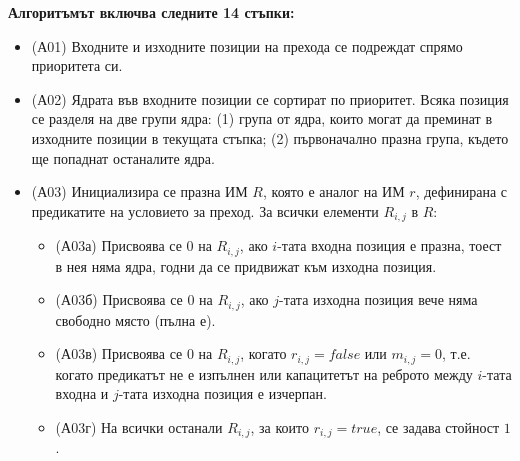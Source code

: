 \vspace{0.5cm}

{\setlength{\parskip}{0pt}  %
\textbf{Алгоритъмът включва следните 14 стъпки:}
}

\vspace{-0.4cm}

\begin{itemize}
  \item (А01) Входните и изходните позиции на прехода се подреждат спрямо приоритета си.

  \item (А02) Ядрата във входните позиции се сортират по приоритет. Всяка позиция се разделя на 
  две групи ядра: (1) група от ядра, които могат да преминат в изходните позиции в текущата стъпка; 
  (2) първоначално празна група, където ще попаднат останалите ядра.

  \item (А03) Инициализира се празна ИМ $R$, която е аналог на ИМ $r$, дефинирана с предикатите 
  на условието за преход. За всички елементи $R_{i,j}$ в $R$:
  \begin{itemize}[itemsep=0.5em]
    \item (А03а) Присвоява се $0$ на $R_{i,j}$, ако $i$-тата входна позиция е празна, тоест в нея 
    няма ядра, годни да се придвижат към изходна позиция.
    \item (А03б) Присвоява се $0$ на $R_{i,j}$, ако $j$-тата изходна позиция вече няма 
    свободно място (пълна е).
    \item (А03в) Присвоява се $0$ на $R_{i,j}$, когато $r_{i,j} = \textit{false}$ или $m_{i,j} = 0$, 
    т.е. когато предикатът не е изпълнен или капацитетът на реброто между $i$-тата входна 
    и $j$-тата изходна позиция е изчерпан.
    \item (А03г) На всички останали $R_{i,j}$, за които $r_{i,j} = \textit{true}$, се задава стойност $1$.
  \end{itemize}


\end{itemize}
